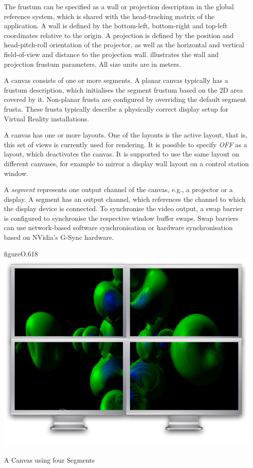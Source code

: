 The frustum can be specified as a wall or projection description in the global
reference system, which is shared with the head-tracking matrix of the
application. A wall is defined by the bottom-left, bottom-right and top-left
coordinates relative to the origin. A projection is defined by the position and
head-pitch-roll orientation of the projector, as well as the horizontal and
vertical field-of-view and distance to the projection wall. 
illustrates the wall and projection frustum parameters. All size units are in
meters.

A canvas consists of one or more segments. A planar canvas typically has a
frustum description, which initialises the segment frustum based on the 2D area
covered by it. Non-planar frusta are configured by overriding the default
segment frusta. These frusta typically describe a physically correct display
setup for Virtual Reality installations.

A canvas has one or more layouts. One of the layouts is the active layout, that
is, this set of views is currently used for rendering. It is possible to
specify {\em OFF} as a layout, which deactivates the canvas. It is supported
to use the same layout on different canvases, for example to mirror a display
wall layout on a control station window.

A {\em segment} represents one output channel of the canvas, e.g., a
projector or a display. A segment has an output channel, which references the
channel to which the display device is connected. To synchronise the video
output, a swap barrier is configured to synchronise the respective window
buffer swaps. Swap barriers can use network-based software synchronisation or
hardware synchronisation based on NVidia's G-Sync hardware.

\begin{wrapfloat}{figure}{O}{.618\textwidth}
  \includegraphics[width=.618\textwidth]{images/canvas.pdf}
  {\caption{\label{fCanvas}A Canvas using four Segments}}
\end{wrapfloat}

